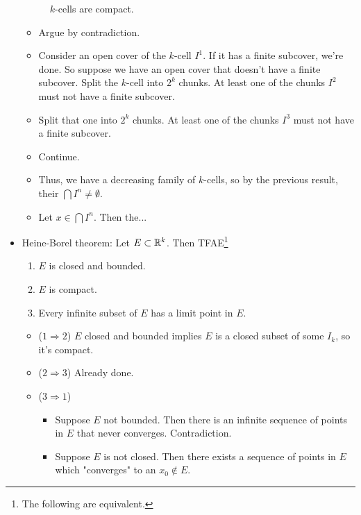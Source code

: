 \documentclass[../../notes.tex]{subfiles}
\begin{document}
\begin{itemize}
\begin{figure}[H]
        \caption{$k$-cells are compact.}
        \label{fig:kcellCompact}
    \end{figure}
    \begin{itemize}
        \item Argue by contradiction.
        \item Consider an open cover of the $k$-cell $I^1$. If it has a finite subcover, we're done. So suppose we have an open cover that doesn't have a finite subcover. Split the $k$-cell into $2^k$ chunks. At least one of the chunks $I^2$ must not have a finite subcover.
        \item Split that one into $2^k$ chunks. At least one of the chunks $I^3$ must not have a finite subcover.
        \item Continue.
        \item Thus, we have a decreasing family of $k$-cells, so by the previous result, their $\bigcap I^n\neq\emptyset$.
        \item Let $x\in\bigcap I^n$. Then the...
    \end{itemize}
    \item Heine-Borel theorem: Let $E\subset\mathbb{R}^k$. Then TFAE\footnote{The following are equivalent.}
    \begin{enumerate}
        \item $E$ is closed and bounded.
        \item $E$ is compact.
        \item Every infinite subset of $E$ has a limit point in $E$.
    \end{enumerate}
    \begin{itemize}
        \item ($1\Rightarrow 2$) $E$ closed and bounded implies $E$ is a closed subset of some $I_k$, so it's compact.
        \item ($2\Rightarrow 3$) Already done.
        \item ($3\Rightarrow 1$)
        \begin{itemize}
            \item Suppose $E$ not bounded. Then there is an infinite sequence of points in $E$ that never converges. Contradiction.
            \item Suppose $E$ is not closed. Then there exists a sequence of points in $E$ which "converges" to an $x_0\notin E$.

\end{itemize}
\end{itemize}
\end{itemize}
\end{document}
